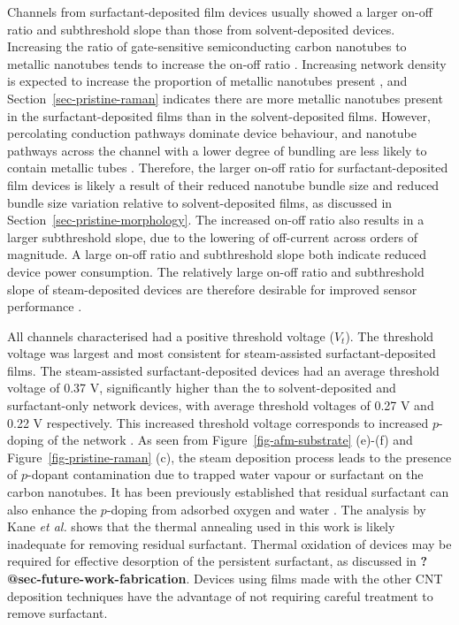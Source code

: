 \documentclass[
  a4paper,
]{scrbook}
\begin{document}
Channels from surfactant-deposited film devices usually showed a larger
on-off ratio and subthreshold slope than those from solvent-deposited
devices. Increasing the ratio of gate-sensitive semiconducting carbon
nanotubes to metallic nanotubes tends to increase the on-off ratio
\autocite{LeMieux2008,Rouhi2011,Zaumseil2015,Murugathas2018}. Increasing
network density is expected to increase the proportion of metallic
nanotubes present \autocite{Rouhi2011}, and
Section~\ref{sec-pristine-raman} indicates there are more metallic
nanotubes present in the surfactant-deposited films than in the
solvent-deposited films. However, percolating conduction pathways
dominate device behaviour, and nanotube pathways across the channel with
a lower degree of bundling are less likely to contain metallic tubes
\autocite{Murugathas2018}. Therefore, the larger on-off ratio for
surfactant-deposited film devices is likely a result of their reduced
nanotube bundle size and reduced bundle size variation relative to
solvent-deposited films, as discussed in
Section~\ref{sec-pristine-morphology}. The increased on-off ratio also
results in a larger subthreshold slope, due to the lowering of
off-current across orders of magnitude. A large on-off ratio and
subthreshold slope both indicate reduced device power consumption. The
relatively large on-off ratio and subthreshold slope of steam-deposited
devices are therefore desirable for improved sensor performance
\autocite{Kauffman2008,Heller2009,Gao2010}.

All channels characterised had a positive threshold voltage (\(V_{t}\)).
The threshold voltage was largest and most consistent for steam-assisted
surfactant-deposited films. The steam-assisted surfactant-deposited
devices had an average threshold voltage of 0.37 V, significantly higher
than the to solvent-deposited and surfactant-only network devices, with
average threshold voltages of 0.27 V and 0.22 V respectively. This
increased threshold voltage corresponds to increased \(p\)-doping of the
network \autocite{Kang2005,Heller2008,Murugathas2018}. As seen from
Figure~\ref{fig-afm-substrate} (e)-(f) and
Figure~\ref{fig-pristine-raman} (c), the steam deposition process leads
to the presence of \(p\)-dopant contamination due to trapped water
vapour or surfactant on the carbon nanotubes. It has been previously
established that residual surfactant can also enhance the \(p\)-doping
from adsorbed oxygen and water
\autocite{Kane2014,Nonoguchi2018,Christensen2022}. The analysis by Kane
\emph{et al.} shows that the thermal annealing used in this work is
likely inadequate for removing residual surfactant. Thermal oxidation of
devices may be required for effective desorption of the persistent
surfactant, as discussed in \textbf{?@sec-future-work-fabrication}.
Devices using films made with the other CNT deposition techniques have
the advantage of not requiring careful treatment to remove surfactant.
\end{document}
